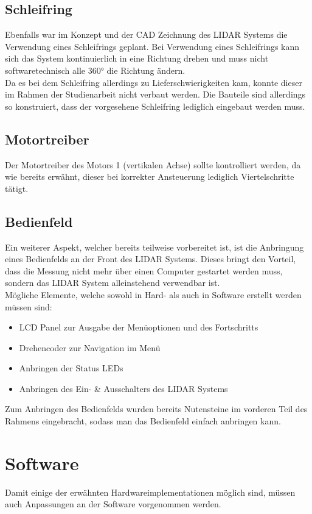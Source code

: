 \subsection{Schleifring}
Ebenfalls war im Konzept und der \ac{CAD} Zeichnung des \ac{LIDAR} Systems die Verwendung eines Schleifrings geplant. Bei Verwendung eines Schleifrings kann sich das System kontinuierlich in eine Richtung drehen und muss nicht softwaretechnisch alle 360° die Richtung ändern.\\
Da es bei dem Schleifring allerdings zu Lieferschwierigkeiten kam, konnte dieser im Rahmen der Studienarbeit nicht verbaut werden. Die Bauteile sind allerdings so konstruiert, dass der vorgesehene Schleifring lediglich eingebaut werden muss. 
\subsection{Motortreiber}
Der Motortreiber des Motors 1 (vertikalen Achse) sollte kontrolliert werden, da wie bereits erwähnt, dieser bei korrekter Ansteuerung lediglich Viertelschritte tätigt. 
\subsection{Bedienfeld}
Ein weiterer Aspekt, welcher bereits teilweise vorbereitet ist, ist die Anbringung eines Bedienfelds an der Front des \ac{LIDAR} Systems. Dieses bringt den Vorteil, dass die Messung nicht mehr über einen Computer gestartet werden muss, sondern das \ac{LIDAR} System alleinstehend verwendbar ist.\\
Mögliche Elemente, welche sowohl in Hard- als auch in Software erstellt werden müssen sind:
\newpage
\begin{itemize}
	\item LCD Panel zur Ausgabe der Menüoptionen und des Fortschritts
	\item Drehencoder zur Navigation im Menü
	\item Anbringen der Status \acp{LED}
	\item Anbringen des Ein- \& Ausschalters des \ac{LIDAR} Systems
\end{itemize}
Zum Anbringen des Bedienfelds wurden bereits Nutensteine im vorderen Teil des Rahmens eingebracht, sodass man das Bedienfeld einfach anbringen kann.

\section{Software}
Damit einige der erwähnten Hardwareimplementationen möglich sind, müssen auch Anpassungen an der Software vorgenommen werden.
